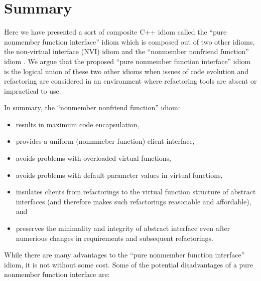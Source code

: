 \documentclass[pdf,ps2pdf,11pt]{SANDreport}
\begin{document}
%
\section{Summary}
%

Here we have presented a sort of composite C++ idiom called the ``pure
nonmember function interface'' idiom which is composed out of two other
idioms, the non-virtual interface (NVI) idiom {}\cite[Item
39]{C++CodingStandards05} and the ``nonmember nonfriend function'' idiom
{}\cite[Item 44]{C++CodingStandards05}.  We argue that the proposed ``pure
nonmember function interface'' idiom is the logical union of these two other
idioms when issues of code evolution and refactoring are considered in an
environment where refactoring tools are absent or impractical to use.

In summary, the ``nonmember nonfriend function'' idiom:

\begin{itemize}

{}\item results in maximum code encapsulation,

{}\item provides a uniform (nonmmeber function) client interface,

{}\item avoids problems with overloaded virtual functions,

{}\item avoids problems with default parameter values in virtual functions,

{}\item insulates clients from refactorings to the virtual function structure
of abstract interfaces (and therefore makes such refactorings reasonable and
affordable), and

{}\item preserves the minimality and integrity of abstract interface even
after numerious changes in requirements and subsequent refactorings.

\end{itemize}

While there are many advantages to the ``pure nonmember function interface''
idiom, it is not without some cost.  Some of the potential disadvantages of a
pure nonmember function interface are:
\end{document}
